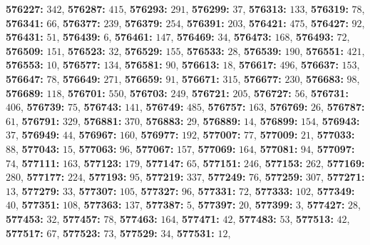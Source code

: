 \textsf{\bfseries 576227:} $342$, \textsf{\bfseries 576287:} $415$, \textsf{\bfseries 576293:} $291$, \textsf{\bfseries 576299:} $37$, \textsf{\bfseries 576313:} $133$, \textsf{\bfseries 576319:} $78$, \textsf{\bfseries 576341:} $66$, \textsf{\bfseries 576377:} $239$, \textsf{\bfseries 576379:} $254$, \textsf{\bfseries 576391:} $203$, \textsf{\bfseries 576421:} $475$, \textsf{\bfseries 576427:} $92$, \textsf{\bfseries 576431:} $51$, \textsf{\bfseries 576439:} $6$, \textsf{\bfseries 576461:} $147$, \textsf{\bfseries 576469:} $34$, \textsf{\bfseries 576473:} $168$, \textsf{\bfseries 576493:} $72$, \textsf{\bfseries 576509:} $151$, \textsf{\bfseries 576523:} $32$, \textsf{\bfseries 576529:} $155$, \textsf{\bfseries 576533:} $28$, \textsf{\bfseries 576539:} $190$, \textsf{\bfseries 576551:} $421$, \textsf{\bfseries 576553:} $10$, \textsf{\bfseries 576577:} $134$, \textsf{\bfseries 576581:} $90$, \textsf{\bfseries 576613:} $18$, \textsf{\bfseries 576617:} $496$, \textsf{\bfseries 576637:} $153$, \textsf{\bfseries 576647:} $78$, \textsf{\bfseries 576649:} $271$, \textsf{\bfseries 576659:} $91$, \textsf{\bfseries 576671:} $315$, \textsf{\bfseries 576677:} $230$, \textsf{\bfseries 576683:} $98$, \textsf{\bfseries 576689:} $118$, \textsf{\bfseries 576701:} $550$, \textsf{\bfseries 576703:} $249$, \textsf{\bfseries 576721:} $205$, \textsf{\bfseries 576727:} $56$, \textsf{\bfseries 576731:} $406$, \textsf{\bfseries 576739:} $75$, \textsf{\bfseries 576743:} $141$, \textsf{\bfseries 576749:} $485$, \textsf{\bfseries 576757:} $163$, \textsf{\bfseries 576769:} $26$, \textsf{\bfseries 576787:} $61$, \textsf{\bfseries 576791:} $329$, \textsf{\bfseries 576881:} $370$, \textsf{\bfseries 576883:} $29$, \textsf{\bfseries 576889:} $14$, \textsf{\bfseries 576899:} $154$, \textsf{\bfseries 576943:} $37$, \textsf{\bfseries 576949:} $44$, \textsf{\bfseries 576967:} $160$, \textsf{\bfseries 576977:} $192$, \textsf{\bfseries 577007:} $77$, \textsf{\bfseries 577009:} $21$, \textsf{\bfseries 577033:} $88$, \textsf{\bfseries 577043:} $15$, \textsf{\bfseries 577063:} $96$, \textsf{\bfseries 577067:} $157$, \textsf{\bfseries 577069:} $164$, \textsf{\bfseries 577081:} $94$, \textsf{\bfseries 577097:} $74$, \textsf{\bfseries 577111:} $163$, \textsf{\bfseries 577123:} $179$, \textsf{\bfseries 577147:} $65$, \textsf{\bfseries 577151:} $246$, \textsf{\bfseries 577153:} $262$, \textsf{\bfseries 577169:} $280$, \textsf{\bfseries 577177:} $224$, \textsf{\bfseries 577193:} $95$, \textsf{\bfseries 577219:} $337$, \textsf{\bfseries 577249:} $76$, \textsf{\bfseries 577259:} $307$, \textsf{\bfseries 577271:} $13$, \textsf{\bfseries 577279:} $33$, \textsf{\bfseries 577307:} $105$, \textsf{\bfseries 577327:} $96$, \textsf{\bfseries 577331:} $72$, \textsf{\bfseries 577333:} $102$, \textsf{\bfseries 577349:} $40$, \textsf{\bfseries 577351:} $108$, \textsf{\bfseries 577363:} $137$, \textsf{\bfseries 577387:} $5$, \textsf{\bfseries 577397:} $20$, \textsf{\bfseries 577399:} $3$, \textsf{\bfseries 577427:} $28$, \textsf{\bfseries 577453:} $32$, \textsf{\bfseries 577457:} $78$, \textsf{\bfseries 577463:} $164$, \textsf{\bfseries 577471:} $42$, \textsf{\bfseries 577483:} $53$, \textsf{\bfseries 577513:} $42$, \textsf{\bfseries 577517:} $67$, \textsf{\bfseries 577523:} $73$, \textsf{\bfseries 577529:} $34$, \textsf{\bfseries 577531:} $12$, 
